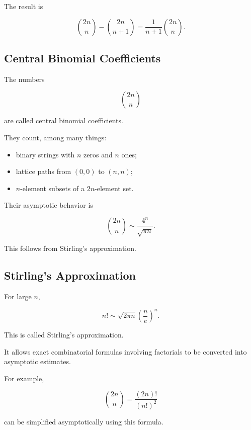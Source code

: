 The result is

\[
\boxed{
\binom{2n}{n}
-
\binom{2n}{n+1}
=
\frac{1}{n+1}\binom{2n}{n}.
}
\]

\subsection{Central Binomial Coefficients}
\label{subsec:central-binomial-coefficients}

The numbers

\[
\boxed{
\binom{2n}{n}
}
\]

are called central binomial coefficients.

They count, among many things:

\begin{itemize}
    \item binary strings with \(n\) zeros and \(n\) ones;
    \item lattice paths from \((0,0)\) to \((n,n)\);
    \item \(n\)-element subsets of a \(2n\)-element set.
\end{itemize}

Their asymptotic behavior is

\[
\boxed{
\binom{2n}{n}
\sim
\frac{4^n}{\sqrt{\pi n}}.
}
\]

This follows from Stirling's approximation.

\subsection{Stirling's Approximation}
\label{subsec:stirlings-approximation}

For large \(n\),

\[
\boxed{
n!
\sim
\sqrt{2\pi n}
\left(\frac{n}{e}\right)^n.
}
\]

This is called Stirling's approximation.

It allows exact combinatorial formulas involving factorials to be
converted into asymptotic estimates.

For example,

\[
\binom{2n}{n}
=
\frac{(2n)!}{(n!)^2}
\]

can be simplified asymptotically using this formula.

